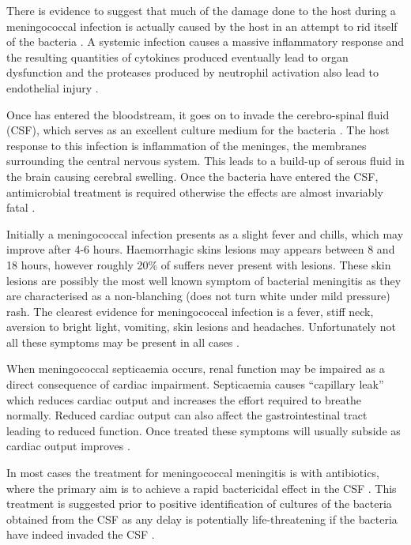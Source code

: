 There is evidence to suggest that much of the damage done to the host during a meningococcal infection is actually caused by the host in an attempt to rid itself of the bacteria \cite{Pathan2003}. A systemic infection causes a massive inflammatory response and the resulting quantities of cytokines produced eventually lead to organ dysfunction and the proteases produced by neutrophil activation also lead to endothelial injury \cite{Pathan2003}.

Once \Nm{} has entered the bloodstream, it goes on to invade the cerebro-spinal fluid (CSF), which serves as an excellent culture medium for the bacteria \cite{DeVoe1982}. The host response to this infection is inflammation of the meninges, the membranes surrounding the central nervous system. This leads to a build-up of serous fluid in the brain causing cerebral swelling. Once the bacteria have entered the CSF, antimicrobial treatment is required otherwise the effects are almost invariably fatal \cite{DeVoe1982}.

Initially a meningococcal infection presents as a slight fever and chills, which may improve after 4-6 hours. Haemorrhagic skins lesions may appears between 8 and 18 hours, however roughly 20\% of suffers never present with lesions. These skin lesions are possibly the most well known symptom of bacterial meningitis as they are characterised as a non-blanching (does not turn white under mild pressure) rash. The clearest evidence for meningococcal infection is a fever, stiff neck, aversion to bright light, vomiting, skin lesions and headaches. Unfortunately not all these symptoms may be present in all cases \cite{DeVoe1982}.

When meningococcal septicaemia occurs, renal function may be impaired as a direct consequence of cardiac impairment. Septicaemia causes ``capillary leak'' which reduces cardiac output and increases the effort required to breathe normally. Reduced cardiac output can also affect the gastrointestinal tract leading to reduced function. Once treated these symptoms will usually subside as cardiac output improves \cite{Pathan2003}.

In most cases the treatment for meningococcal meningitis is with antibiotics, where the primary aim is to achieve a rapid bactericidal effect in the CSF \cite{Deuren2000}. This treatment is suggested prior to positive identification of cultures of the bacteria obtained from the CSF as any delay is potentially life-threatening if the bacteria have indeed invaded the CSF \cite{DeVoe1982}.

